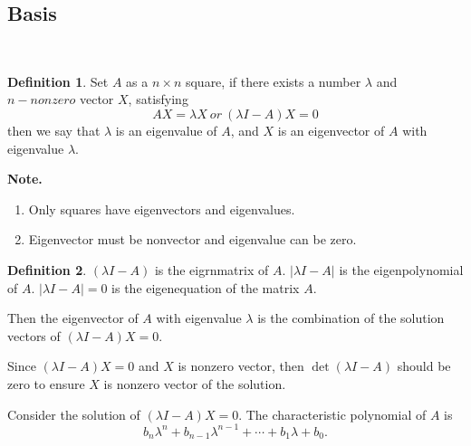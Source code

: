 \documentclass{article}
\theoremstyle{definition}
\newtheorem{defi}{Definition}[section]
\begin{document}
\subsection{Basis}\
\begin{defi}
    Set $A$ as a $n\times n$ square, if there exists a 
    number $\lambda$ and $n-nonzero$ vector $X$, satisfying 
    $$AX=\lambda X\ or\ (\lambda I-A)X=0$$
    then we say that $\lambda$ is an eigenvalue of $A$, and
    $X$ is an eigenvector of $A$ with eigenvalue $\lambda$.
\end{defi}

\textbf{Note.}
\begin{enumerate}
    \item Only squares have eigenvectors and eigenvalues.
    \item Eigenvector must be nonvector and eigenvalue can be zero.
\end{enumerate}


\begin{defi}
    $(\lambda I-A)$ is the eigrnmatrix of $A$. $|\lambda I-A|$ is the eigenpolynomial of $A$.
    $|\lambda I-A|=0$ is the eigenequation of the matrix $A$.
\end{defi}

Then the eigenvector of $A$ with eigenvalue $\lambda$ is the combination of the solution vectors of $(\lambda I-A)X=0$.

Since $(\lambda I-A)X=0$ and $X$ is nonzero vector, then 
$\det (\lambda I-A)$ should be zero to ensure $X$ is nonzero vector of the solution.

Consider the solution of $(\lambda I-A)X=0$.
The characteristic polynomial of $A$ is 
$$b_{n}\lambda^{n}+b_{n-1}\lambda^{n-1}+\cdots+b_{1}\lambda+b_{0}.$$
\end{document}
